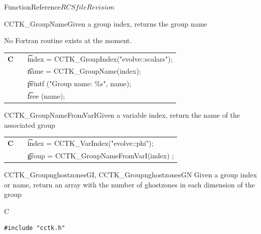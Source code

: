 \begin{cactuspart}{FunctionReference}{$RCSfile$}{$Revision$}
\begin{CCTKFunc}{CCTK\_GroupName}{Given a group index, returns the group name}
\begin{discussion}
No Fortran routine exists at the moment.
\end{discussion}
\begin{examples}
\begin{tabular}{@{}p{3cm}cp{11cm}}
\hfill {\bf C} && {\t index = CCTK\_GroupIndex("evolve::scalars");}\\
               && {\t name = CCTK\_GroupName(index);}\\
               && {\t printf ("Group name: \%s", name);}\\
               && {\t free (name);}
\\
\end{tabular}
\end{examples}
\begin{errorcodes}
\end{errorcodes}
\end{CCTKFunc}


\begin{CCTKFunc}{CCTK\_GroupNameFromVarI}{Given a variable index, return the name of the associated group}
\label{CCTK-GroupNameFromVarI}
\showcargs
\begin{params}
\end{params}
\begin{discussion}
\end{discussion}
\begin{examples}
\begin{tabular}{@{}p{3cm}cp{11cm}}
\hfill {\bf C} && {\t index = CCTK\_VarIndex("evolve::phi");} \\
               && {\t group = CCTK\_GroupNameFromVarI(index) ;}
\\
\end{tabular}
\end{examples}
\begin{errorcodes}
\end{errorcodes}
\end{CCTKFunc}



\begin{FunctionDescription}{CCTK\_GroupnghostzonesGI, CCTK\_GroupnghostzonesGN}
\label{CCTK-GroupnghostzonesGI}
\label{CCTK-GroupnghostzonesGN}
  Given a group index or name, return an array with the number of ghostzones in each dimension of the group
\begin{SynopsisSection}
\begin{Synopsis}{C}
\begin{verbatim}
#include "cctk.h"


\end{verbatim}
\end{Synopsis}
\end{SynopsisSection}
\end{FunctionDescription}
\end{cactuspart}
